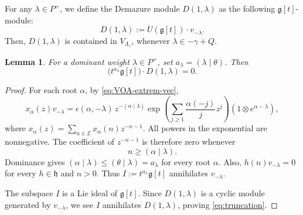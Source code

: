 \documentclass[a4paper, 12pt]{amsart}
\newtheorem{lemma}[theorem]{Lemma}
\theoremstyle{definition}
\newcommand{\g}{\mathfrak g}
\newcommand{\fh}{\mathfrak{h}}
\begin{document}
For any $\lambda\in P^+$, we define the Demazure module $D(1,\lambda)$ as the following $\mathfrak{g}[t]$-module:
\begin{equation}  D(1,\lambda):= U(\mathfrak{g}[t])\cdot v_{-\lambda}.   \end{equation}
Then, $D(1,\lambda)$ is contained in $V_{\Lambda_\gamma}$, whenever $\lambda\in -\gamma+ Q$.



\begin{lemma}
\label{lem:truncation}
For a  dominant weight $\lambda \in P^+$, set
$a_\lambda=(\lambda\mid \theta)$. Then
\begin{equation}
\bigl(  t^{a_\lambda}\g [t]  \bigr)\cdot D(1,\lambda)=0.
\label{eq:truncation}
\end{equation}
\end{lemma}
\nopagebreak[4]
\begin{proof}
For each root $\alpha$, by \eqref{eq:VOA-extrem-vec},
\begin{equation}
x_\alpha(z)v_{-\lambda}=\epsilon(\alpha,-\lambda)\,z^{-(\alpha\mid \lambda) }
\exp\left(\sum_{j\geq1}\frac{\alpha(-j)}jz^j\right)(1\otimes e^{\alpha-\lambda}),
\label{eq:fk-pole}
\end{equation}
where  $x_\alpha(z)=\sum_{n\in \mathbb{Z} }x_\alpha(n)z^{-n-1}$.
All powers in the exponential are nonnegative. The coefficient of
$z^{-n-1}$ is therefore zero whenever
\begin{equation}
n \geq(\alpha\mid \lambda).
\label{eq:root-annihilation}
\end{equation}
Dominance gives $(\alpha\mid \lambda)  \leq(\theta\mid \lambda)=a_\lambda$ for every root
$\alpha$. Also, $h(n)v_{-\lambda}=0$ for every $h\in\fh$ and $n>0$.
Thus $I:=t^{a_\lambda}\g [t]$ annihilates $v_{-\lambda}$.

The subspace $I$ is a Lie ideal of $\g[t]$. Since $D(1,\lambda)$ is a cyclic module generated by $v_{-\lambda}$, we see $I$ annihilates $D(1,\lambda)$, proving \eqref{eq:truncation}.

\end{proof}
\end{document}
